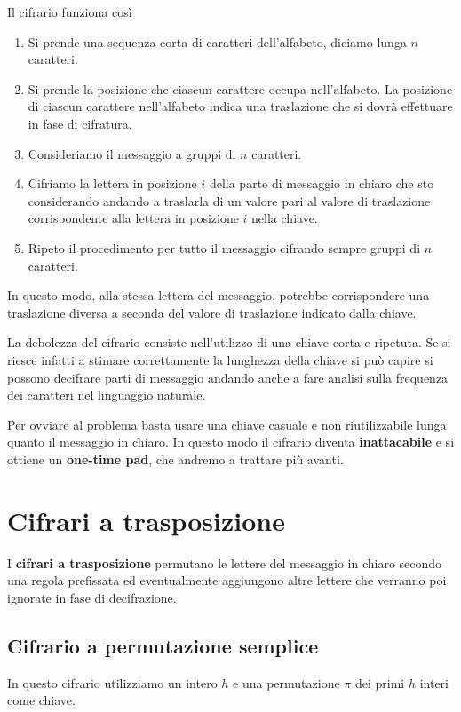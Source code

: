 Il cifrario funziona cos\`i
\begin{enumerate}
	\item Si prende una sequenza corta di caratteri dell'alfabeto, diciamo lunga $n$ caratteri.
	\item Si prende la posizione che ciascun carattere occupa nell'alfabeto. La posizione di ciascun carattere
	      nell'alfabeto indica una traslazione che si dovr\`a effettuare in fase di cifratura.
	\item Consideriamo il messaggio a gruppi di $n$ caratteri.
	\item Cifriamo la lettera in posizione $i$ della parte di messaggio in chiaro che sto considerando andando a traslarla
	      di un valore pari al valore di traslazione corrispondente alla lettera in posizione $i$ nella chiave.
	\item Ripeto il procedimento per tutto il messaggio cifrando sempre gruppi di $n$ caratteri.
\end{enumerate}
In questo modo, alla stessa lettera del messaggio, potrebbe corrispondere una traslazione diversa a seconda del valore di
traslazione indicato dalla chiave.

La debolezza del cifrario consiste nell'utilizzo di una chiave corta e ripetuta. Se si riesce infatti a stimare
correttamente la lunghezza della chiave si pu\`o capire si possono decifrare parti di messaggio andando anche a fare
analisi sulla frequenza dei caratteri nel linguaggio naturale.

Per ovviare al problema basta usare una chiave casuale e non riutilizzabile lunga quanto il messaggio in chiaro. In questo
modo il cifrario diventa \textbf{inattacabile} e si ottiene un \textbf{one-time pad}, che andremo a trattare pi\`u avanti.

\section{Cifrari a trasposizione}
I \textbf{cifrari a trasposizione} permutano le lettere del messaggio in chiaro secondo una regola prefissata ed
eventualmente aggiungono altre lettere che verranno poi ignorate in fase di decifrazione.

\subsection{Cifrario a permutazione semplice}
In questo cifrario utilizziamo un intero $h$ e una permutazione $\pi$ dei primi $h$ interi come chiave.

